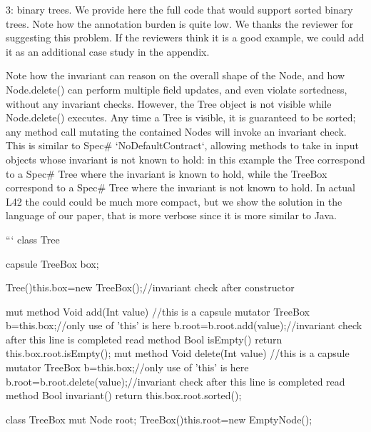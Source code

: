 3: binary trees. We provide here the full code that would support sorted binary trees.
Note how the annotation burden is quite low. We thanks the reviewer for suggesting this problem.
If the reviewers think it is a good example, we could add it as an additional case study in the appendix.

Note how the invariant can reason on the overall shape of the Node, and
how Node.delete() can perform multiple field updates,
and even violate sortedness, without any invariant checks.
However, the Tree object is not visible while Node.delete() executes.
Any time a Tree is visible, it is guaranteed to be sorted;
any method call mutating the contained Nodes will invoke an invariant check.
This is similar to Spec# `NoDefaultContract`, allowing methods to take in input
objects whose invariant is not known to hold:
in this example the Tree correspond to a Spec# Tree where the invariant
is known to hold, while the TreeBox correspond to a Spec# Tree where the invariant is not known to hold.
In actual L42 the could could be much more compact, but we show the solution in the language of our paper,
that is more verbose since it is more similar to Java.

``` 
class Tree {
  capsule TreeBox box;

  Tree(){this.box=new TreeBox();}//invariant check after constructor

  mut method Void add(Int value) {//this is a capsule mutator
    TreeBox b=this.box;//only use of 'this' is here
    b.root=b.root.add(value);//invariant check after this line is completed
  }
  read method Bool isEmpty() {return this.box.root.isEmpty();}
  mut method Void delete(Int value) {//this is a capsule mutator
    TreeBox b=this.box;//only use of 'this' is here
     b.root=b.root.delete(value);//invariant check after this line is completed
  }
  read method Bool invariant() {return this.box.root.sorted();}
}

class TreeBox{ mut Node root; TreeBox(){this.root=new EmptyNode();} }


